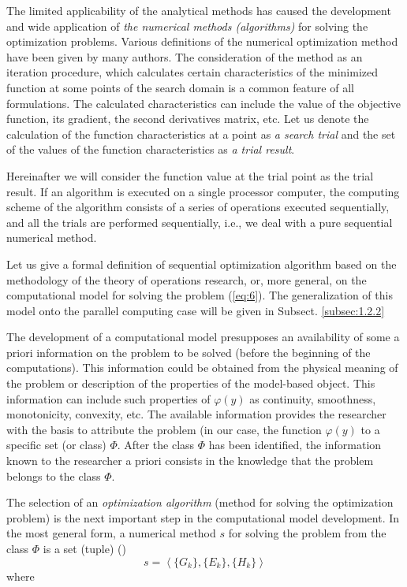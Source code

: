 The limited applicability of the analytical methods has caused the development and wide application of \textit {the numerical methods (algorithms)} for solving the optimization problems. Various definitions of the numerical optimization method have been given by many authors. The consideration of the method as an iteration procedure, which calculates certain characteristics of the minimized function at some points of the search domain is a common feature of all formulations. The calculated characteristics can include the value of the objective function, its gradient, the second derivatives matrix, etc. Let us denote the calculation of the function characteristics at a point as \textit {a search trial} and the set of the values of the function characteristics as \textit {a trial result}.

Hereinafter we will consider the function value at the trial point as the trial result. If an algorithm is executed on a single processor computer, the computing scheme of the algorithm consists of a series of operations executed sequentially, and all the trials are performed sequentially, i.e., we deal with a pure sequential numerical method. 

Let us give a formal definition of sequential optimization algorithm based on the methodology of the theory of operations research, or, more general, on the computational model for solving the problem (\ref{eq:6}). The generalization of this model onto the parallel computing case will be given in Subsect. \ref{subsec:1.2.2}

The development of a computational model presupposes an availability of some a priori information on the problem to be solved (before the beginning of the computations). This information could be obtained from the physical meaning of the problem or description of the properties of the model-based object. This information can include such properties of $\varphi(y)$ as continuity, smoothness, monotonicity, convexity, etc. The available information provides the researcher with the basis to attribute the problem (in our case, the function $\varphi(y)$ to a specific set (or class) $\Phi$. After the class $\Phi$ has been identified, the information known to the researcher a priori consists in the knowledge that the problem belongs to the class $\Phi$.

The selection of an \textit {optimization algorithm} (method for solving  the optimization problem) is the next important step in the computational model development. In the most general form, a numerical method $s$ for solving the problem from the class $\Phi$ is a set  (tuple) (\cite{1_StrMonRus})
\begin{equation}
\label{eq:11}
s=\left\langle \{G_k\},\{E_k\},\{H_k\}\right\rangle
\end{equation}
where 

